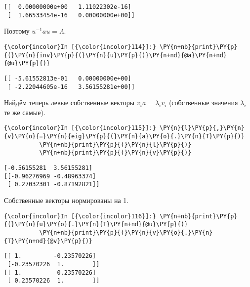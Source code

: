     \begin{Verbatim}[commandchars=\\\{\}]
[[  0.00000000e+00   1.11022302e-16]
 [  1.66533454e-16   0.00000000e+00]]

    \end{Verbatim}

    Поэтому \(u^{-1} a u = \Lambda\).

    \begin{Verbatim}[commandchars=\\\{\}]
{\color{incolor}In [{\color{incolor}114}]:} \PY{n+nb}{print}\PY{p}{(}\PY{n}{inv}\PY{p}{(}\PY{n}{u}\PY{p}{)}\PY{n+nd}{@a}\PY{n+nd}{@u}\PY{p}{)}
\end{Verbatim}

    \begin{Verbatim}[commandchars=\\\{\}]
[[ -5.61552813e-01   0.00000000e+00]
 [ -2.22044605e-16   3.56155281e+00]]

    \end{Verbatim}

    Найдём теперь левые собственные векторы \(v_i a = \lambda_i v_i\)
(собственные значения \(\lambda_i\) те же самые).

    \begin{Verbatim}[commandchars=\\\{\}]
{\color{incolor}In [{\color{incolor}115}]:} \PY{n}{l}\PY{p}{,}\PY{n}{v}\PY{o}{=}\PY{n}{eig}\PY{p}{(}\PY{n}{a}\PY{o}{.}\PY{n}{T}\PY{p}{)}
          \PY{n+nb}{print}\PY{p}{(}\PY{n}{l}\PY{p}{)}
          \PY{n+nb}{print}\PY{p}{(}\PY{n}{v}\PY{p}{)}
\end{Verbatim}

    \begin{Verbatim}[commandchars=\\\{\}]
[-0.56155281  3.56155281]
[[-0.96276969 -0.48963374]
 [ 0.27032301 -0.87192821]]

    \end{Verbatim}

    Собственные векторы нормированы на 1.

    \begin{Verbatim}[commandchars=\\\{\}]
{\color{incolor}In [{\color{incolor}116}]:} \PY{n+nb}{print}\PY{p}{(}\PY{n}{u}\PY{o}{.}\PY{n}{T}\PY{n+nd}{@u}\PY{p}{)}
          \PY{n+nb}{print}\PY{p}{(}\PY{n}{v}\PY{o}{.}\PY{n}{T}\PY{n+nd}{@v}\PY{p}{)}
\end{Verbatim}

    \begin{Verbatim}[commandchars=\\\{\}]
[[ 1.         -0.23570226]
 [-0.23570226  1.        ]]
[[ 1.          0.23570226]
 [ 0.23570226  1.        ]]

    \end{Verbatim}

